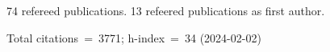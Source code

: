 74 refereed publications. 13 refeered publications as first author.

Total citations~=~3771; h-index~=~34 (2024-02-02)